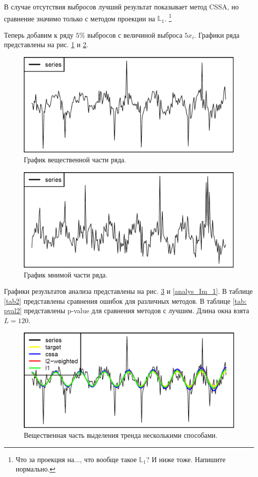 \documentclass[specialist,
               substylefile = spbu.rtx,
               subf,href,colorlinks=true, 12pt]{disser}
\begin{document}
В случае отсутствия выбросов лучший результат показывает метод CSSA, но сравнение значимо только с методом проекции на $\mathbb{L}_1$.
\footnote{Что за проекция на..., что вообще такое $\mathbb{L}_1$? И ниже тоже. Напишите нормально.}

Теперь добавим к ряду $5\%$ выбросов с величиной выброса $5x_i$. Графики ряда представлены на рис. \ref{ser_Re_1} и \ref{ser_Im_1}.

\begin{figure}[H]
	\begin{center}
		\includegraphics[width=0.67\linewidth]{img/ser_1_Re.png}
	\end{center}
	\caption{График вещественной части ряда.}
	\label{ser_Re_1}
\end{figure}

\begin{figure}[H]
	\begin{center}
		\includegraphics[width=0.67\linewidth]{img/ser_1_Im.png}
	\end{center}
	\caption{График мнимой части ряда.}
	\label{ser_Im_1}
\end{figure}

Графики результатов анализа представлены на рис. \ref{analys_Re_1} и \ref{analys_Im_1}. В таблице \ref{tab2} представлены сравнения ошибок для различных методов.  В таблице \ref{tab: pval2} представлены p-value для сравнения методов с лучшим. Длина окна взята $L = 120$.

\begin{figure}[H]
	\begin{center}
		\includegraphics[width=0.67\linewidth]{img/analys_1_Re.png}
	\end{center}
	\caption{Вещественная часть выделения тренда несколькими способами.}
	\label{analys_Re_1}
\end{figure}
\end{document}
